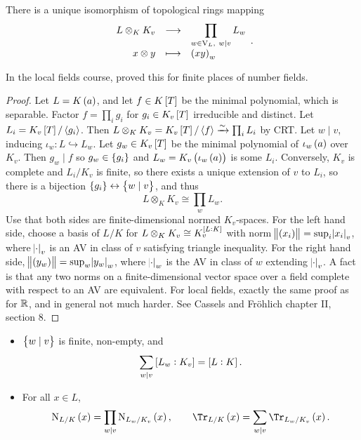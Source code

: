 \begin{proposition}
There is a unique isomorphism of topological rings mapping
$$ \function{L \otimes_K K_v}{\prod_{w \in \V_L, \ w \mid v} L_w}{x \otimes y}{\br{xy}_w}. $$
\end{proposition}

In the local fields course, proved this for finite places of number fields.

\begin{proof}
Let $ L = K\br{a} $, and let $ f \in K\sbr{T} $ be the minimal polynomial, which is separable. Factor $ f = \prod_i g_i $ for $ g_i \in K_v\sbr{T} $ irreducible and distinct. Let $ L_i = K_v\sbr{T} / \abr{g_i} $. Then $ L \otimes_K K_v = K_v\sbr{T} / \abr{f} \xrightarrow{\sim} \prod_i L_i $ by CRT. Let $ w \mid v $, inducing $ \iota_w : L \hookrightarrow L_w $. Let $ g_w \in K_v\sbr{T} $ be the minimal polynomial of $ \iota_w\br{a} $ over $ K_v $. Then $ g_w \mid f $ so $ g_w \in \cbr{g_i} $ and $ L_w = K_v\br{\iota_w\br{a}} $ is some $ L_i $. Conversely, $ K_v $ is complete and $ L_i / K_v $ is finite, so there exists a unique extension of $ v $ to $ L_i $, so there is a bijection $ \cbr{g_i} \leftrightarrow \cbr{w \mid v} $, and thus
$$ L \otimes_K K_v \cong \prod_w L_w. $$
Use that both sides are finite-dimensional normed $ K_v $-spaces. For the left hand side, choose a basis of $ L / K $ for $ L \otimes_K K_v \cong K_v^{\sbr{L : K}} $ with norm $ \norm{\br{x_i}} = \sup_i \abs{x_i}_v $, where $ \abs{\cdot}_v $ is an AV in class of $ v $ satisfying triangle inequality. For the right hand side, $ \norm{\br{y_w}} = \sup_w \abs{y_w}_w $, where $ \abs{\cdot}_w $ is the AV in class of $ w $ extending $ \abs{\cdot}_v $. A fact is that any two norms on a finite-dimensional vector space over a field complete with respect to an AV are equivalent. For local fields, exactly the same proof as for $ \mathbb{R} $, and in general not much harder. See Cassels and Fr\"ohlich chapter II, section $ 8 $.
\end{proof}

\begin{corollary}
\label{cor:1.6}
\hfill
\begin{itemize}
\item $ \cbr{w \mid v} $ is finite, non-empty, and
$$ \sum_{w \mid v} \sbr{L_w : K_v} = \sbr{L : K}. $$
\item For all $ x \in L $,
$$ \N_{L / K}\br{x} = \prod_{w \mid v} \N_{L_w / K_v}\br{x}, \qquad \Tr_{L / K}\br{x} = \sum_{w \mid v} \Tr_{L_w / K_v}\br{x}. $$
\end{itemize}
\end{corollary}

